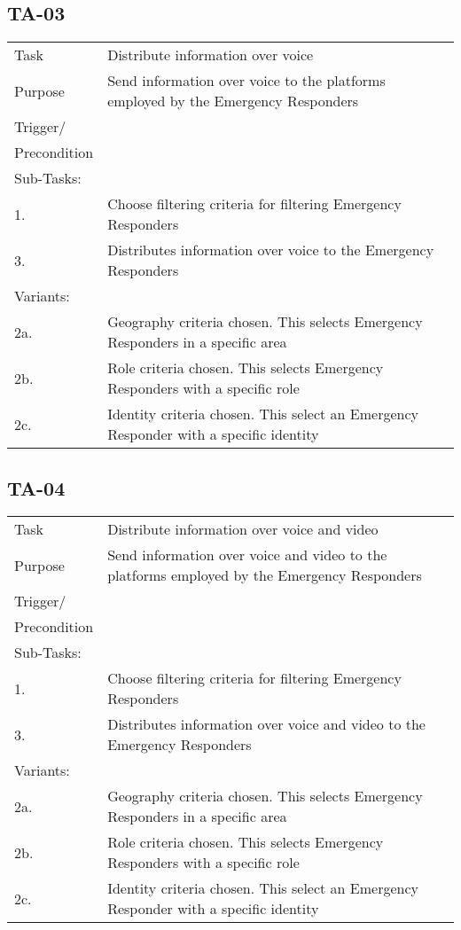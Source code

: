 \newpage
\subsection{TA-03}
\begin{longtable}{| p{2.5cm}  | p{10cm} |  }
	\hline
	Task & Distribute information over voice \\
	Purpose & Send information over voice to the platforms employed by the Emergency Responders \\
	Trigger/ &  \\ Precondition &  \\
	\hline
	Sub-Tasks: & \\
	1. & Choose filtering criteria for filtering Emergency Responders \\
	3. & Distributes information over voice to the Emergency Responders \\
	\hline
	Variants: & \\
	2a. & Geography criteria chosen. This selects Emergency Responders in a specific area \\
	2b. & Role criteria chosen. This selects Emergency Responders with a specific role\\
	2c. & Identity criteria chosen. This select an Emergency Responder with a specific identity \\
	\hline
\end{longtable}

\subsection{TA-04}
\begin{longtable}{| p{2.5cm}  | p{10cm} |  }
	\hline
	Task & Distribute information over voice and video \\
	Purpose & Send information over voice and video to the platforms employed by the Emergency Responders \\
	Trigger/ &  \\ Precondition &  \\
	\hline
	Sub-Tasks: & \\
	1. & Choose filtering criteria for filtering Emergency Responders \\
	3. & Distributes information over voice and video to the Emergency Responders \\
	\hline
	Variants: & \\
	2a. & Geography criteria chosen. This selects Emergency Responders in a specific area \\
	2b. & Role criteria chosen. This selects Emergency Responders with a specific role\\
	2c. & Identity criteria chosen. This select an Emergency Responder with a specific identity \\
	\hline
\end{longtable}

